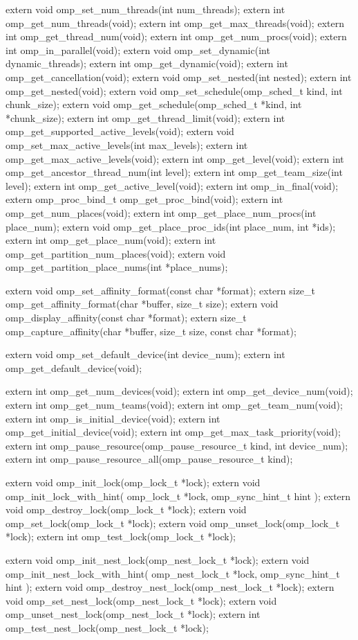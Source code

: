 {\begin{ompcFunction}
{extern void omp_set_num_threads(int num_threads);
extern int omp_get_num_threads(void);
extern int omp_get_max_threads(void);
extern int omp_get_thread_num(void);
extern int omp_get_num_procs(void);
extern int omp_in_parallel(void);
extern void omp_set_dynamic(int dynamic_threads);
extern int omp_get_dynamic(void);
extern int omp_get_cancellation(void);
extern void omp_set_nested(int nested);
extern int omp_get_nested(void);
extern void omp_set_schedule(omp_sched_t kind, int chunk_size);
extern void omp_get_schedule(omp_sched_t *kind, int *chunk_size);
extern int omp_get_thread_limit(void);
extern int omp_get_supported_active_levels(void);
extern void omp_set_max_active_levels(int max_levels);
extern int omp_get_max_active_levels(void);
extern int omp_get_level(void);
extern int omp_get_ancestor_thread_num(int level);
extern int omp_get_team_size(int level);
extern int omp_get_active_level(void);
extern int omp_in_final(void);
extern omp_proc_bind_t omp_get_proc_bind(void);
extern int omp_get_num_places(void);
extern int omp_get_place_num_procs(int place_num);
extern void omp_get_place_proc_ids(int place_num, int *ids);
extern int omp_get_place_num(void);
extern int omp_get_partition_num_places(void);
extern void omp_get_partition_place_nums(int *place_nums);

extern void omp_set_affinity_format(const char *format);
extern size_t omp_get_affinity_format(char *buffer, size_t size);
extern void omp_display_affinity(const char *format);
extern size_t omp_capture_affinity(char *buffer, size_t size, const char *format);

extern void omp_set_default_device(int device_num);
extern int omp_get_default_device(void);

extern int omp_get_num_devices(void);
extern int omp_get_device_num(void);
extern int omp_get_num_teams(void);
extern int omp_get_team_num(void);
extern int omp_is_initial_device(void);
extern int omp_get_initial_device(void);
extern int omp_get_max_task_priority(void);
extern int omp_pause_resource(omp_pause_resource_t kind, int device_num);
extern int omp_pause_resource_all(omp_pause_resource_t kind);

extern void omp_init_lock(omp_lock_t *lock);
extern void omp_init_lock_with_hint(
  omp_lock_t *lock,
  omp_sync_hint_t hint
);
extern void omp_destroy_lock(omp_lock_t *lock);
extern void omp_set_lock(omp_lock_t *lock);
extern void omp_unset_lock(omp_lock_t *lock);
extern int omp_test_lock(omp_lock_t *lock);

extern void omp_init_nest_lock(omp_nest_lock_t *lock);
extern void omp_init_nest_lock_with_hint(
  omp_nest_lock_t *lock,
  omp_sync_hint_t hint
);
extern void omp_destroy_nest_lock(omp_nest_lock_t *lock);
extern void omp_set_nest_lock(omp_nest_lock_t *lock);
extern void omp_unset_nest_lock(omp_nest_lock_t *lock);
extern int omp_test_nest_lock(omp_nest_lock_t *lock);

}
\end{ompcFunction}}
